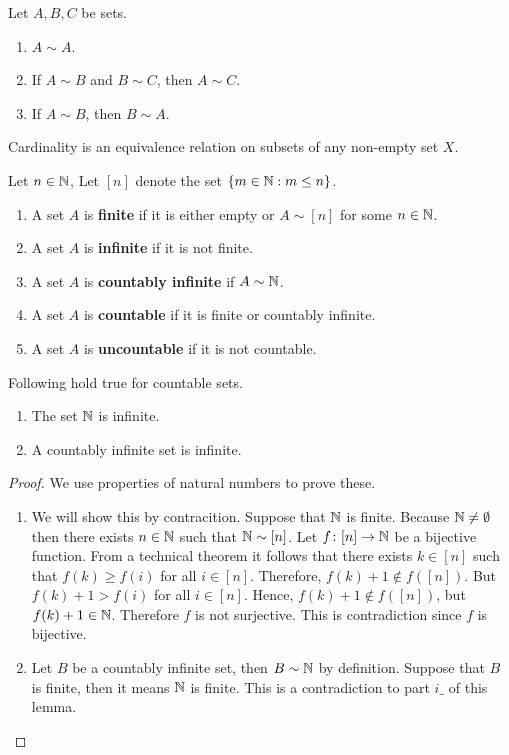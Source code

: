 \documentclass[a4paper,english,12pt]{article}   	%
\begin{document}
\begin{lem} Let $A,B,C$ be sets.
\begin{enumerate}[i$\_$]
\item $A \sim A$.
\item If $A \sim B$ and $B \sim C$, then $A \sim C$.
\item If $A \sim B$, then $B \sim A$.
\end{enumerate}
\end{lem}
\begin{cor} Cardinality is an equivalence relation on subsets of any non-empty set $X$.
\end{cor}

\begin{defn} Let $n \in \mathbb{N}$, Let $[n]$ denote the set $\{m \in \mathbb{N}: m \leq n\}$.
\begin{enumerate}
\item A set $A$ is \textbf{finite} if it is either empty or $A \sim [n]$ for some $n \in \mathbb{N}$.
\item A set $A$ is \textbf{infinite} if it is not finite.
\item A set $A$ is \textbf{countably infinite} if $A \sim \mathbb{N}$.
\item A set $A$ is \textbf{countable} if it is finite or countably infinite.
\item A set $A$ is \textbf{uncountable} if it is not countable.
\end{enumerate}
\end{defn}
\begin{lem}\label{Lemma:CtblSets} Following hold true for countable sets.
\begin{enumerate}[i$\_$]
\item The set $\mathbb{N}$ is infinite.
\item A countably infinite set is infinite.%
\end{enumerate}
\end{lem}
\begin{proof} We use properties of natural numbers to prove these.
\begin{enumerate}
	\item We will show  this by contracition. Suppose that $\mathbb{N}$ is finite. Because $\mathbb{N} \neq \emptyset$ then there exists $n \in \mathbb{N}$ such that $\mathbb{N} \sim [n]$.
Let $f \colon [n] \to \mathbb{N}$ be a bijective function. From a technical theorem it follows that there exists $k \in [n]$ such that $f(k) \geq f(i) $ for all $i \in [n]$. Therefore, $f(k)+1 \notin f([n])$. But $f(k)+1 > f(i)$ for all $i \in [n]$. Hence, $f(k) + 1 \notin f([n])$, but $f(k)+1 \in \mathbb{N}$. Therefore $f$ is not surjective. This is contradiction since $f$ is bijective. %
	\item Let $B$ be a countably infinite set, then $B \sim \mathbb{N}$ by definition. Suppose that $B$ is finite, then it means $\mathbb{N}$ is finite. This is a contradiction to part $i\_$ of this lemma.
\end{enumerate}
\end{proof} 
\end{document}
